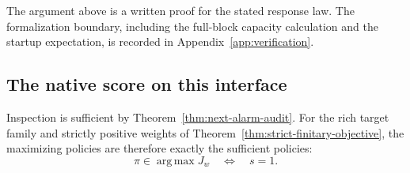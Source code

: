 The argument above is a written proof for the stated response law.
The formalization boundary, including the full-block capacity calculation and
the startup expectation, is recorded in Appendix~\ref{app:verification}.

\subsection{The native score on this interface}
Inspection is sufficient by Theorem~\ref{thm:next-alarm-audit}.
For the rich target family and strictly positive weights of
Theorem~\ref{thm:strict-finitary-objective}, the maximizing policies are therefore
exactly the sufficient policies:
\[
 \pi\in\operatorname*{arg\,max}J_w\quad\Longleftrightarrow\quad s=1.
\]
